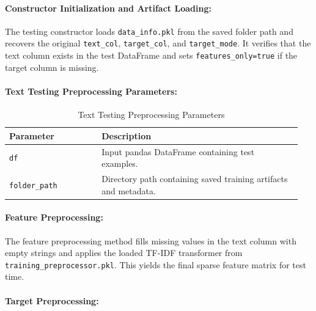 \paragraph{Constructor Initialization and Artifact Loading:}\par

The testing constructor loads \texttt{data\_info.pkl} from the saved folder path and recovers the original \texttt{text\_col}, \texttt{target\_col}, and \texttt{target\_mode}. It verifies that the text column exists in the test DataFrame and sets \texttt{features\_only=true} if the target column is missing.
\vspace{1cm}
\paragraph{Text Testing Preprocessing Parameters:}\par

\begin{table}[!htbp]
\centering
\caption{Text Testing Preprocessing Parameters}
\label{tab:text_testing_params}
\begin{tabular}{p{0.30\linewidth}p{0.65\linewidth}}
\toprule
\textbf{Parameter} & \textbf{Description} \\
\midrule

\texttt{df} & Input pandas DataFrame containing test examples.\\

\texttt{folder\_path} & Directory path containing saved training artifacts and metadata.\\

\bottomrule
\end{tabular}
\end{table}
\vspace{1cm}
\paragraph{Feature Preprocessing:}\par

The feature preprocessing method fills missing values in the text column with empty strings and applies the loaded TF-IDF transformer from \texttt{training\_preprocessor.pkl}. This yields the final sparse feature matrix for test time.
\vspace{1cm}
\paragraph{Target Preprocessing:}\par

